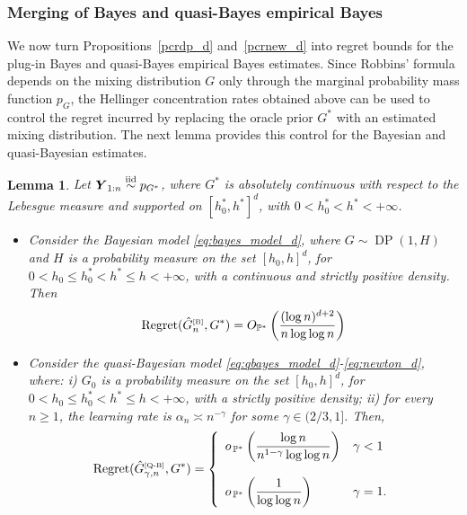 \documentclass[twoside,12pt]{article}
\def\simiid{\stackrel{\mbox{\scriptsize{iid}}}{\sim}}
\newtheorem{lem}[thm]{Lemma}
\begin{document}
\subsubsection{Merging of Bayes and quasi-Bayes empirical Bayes}\label{sec:merging_d}

We now turn Propositions~\ref{pcrdp_d} and~\ref{pcrnew_d} into regret bounds for the plug-in Bayes and quasi-Bayes empirical Bayes estimates. Since Robbins' formula depends on the mixing distribution $G$ only through the marginal probability mass function $p_{G}$, the Hellinger concentration rates obtained above can be used to control the regret incurred by replacing the oracle prior $G^\ast$ with an estimated mixing distribution. The next lemma provides this control for the Bayesian and quasi-Bayesian estimates.

\begin{lem}\label{lemma:Janad}
Let $\boldsymbol Y_{1:n}\simiid p_{G^\ast}$, where $G^\ast$ is absolutely continuous with respect to the Lebesgue measure and supported on $[h_0^\ast,h^\ast]^d$, with $0<h_0^\ast<h^\ast<+\infty$.  
\begin{itemize}
    \item[a)]  Consider the Bayesian model \eqref{eq:bayes_model_d}, where  $G\sim\operatorname{DP}(1,H)$ and $H$ is a probability measure on the set $[h_{0},h]^d$, for $0<h_{0}\leq h_{0}^{\ast}<h^{\ast}\leq h<+\infty$, with a continuous and strictly positive density. Then 
\begin{align*}
\mathrm{Regret}(\hat G_{n}^{\text{\tiny{[B]}}},G^*)=O_{\mathbb P^\ast}\left(\frac{(\log n)^{d+2}}{n\log\log n}\right)
\end{align*}
\item[b)] Consider the quasi-Bayesian model \eqref{eq:qbayes_model_d}-\eqref{eq:newton_d}, where: i)  $G_0$ is a probability measure on the set $[h_0,h]^d$, for  $0<h_0\leq h_0^\ast< h^\ast\leq h<+\infty$, with a strictly positive density; ii) for every $n\geq1$, the learning rate is $\alpha_n\asymp n^{-\gamma}$ for some $\gamma\in (2/3,1]$. Then,
\begin{align}\label{eq:regret_rate_qb_d}
\mathrm{Regret}(\hat G_{\gamma,n}^{\text{\tiny{[Q-B]}}},G^*)  =
\left\{
\begin{array}{ll}
o_{\,\mathbb{P}^{\ast}}\left(\dfrac{\log n}{n^{1-\gamma}\log\log n}\right)&\gamma <1\\
\\
o_{\,\mathbb{P}^{\ast}}\left(\dfrac{1}{\log\log n}\right)&\gamma =1.
\end{array}
\right.
\end{align}
\end{itemize}
\end{lem}
\end{document}
